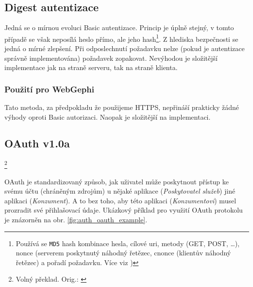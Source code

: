 \documentclass[thesis=M,czech]{FITthesis}[2014/05/6]
\begin{document}
\subsection{Digest autentizace\cite{wiki:digest}}
Jedná se o mírnou evoluci Basic autentizace. Princip je úplně stejný, v tomto případě se však neposílá heslo přímo, ale jeho hash\footnote{Používá se \texttt{MD5} hash kombinace hesla, cílové uri, metody (GET, POST, \ldots), nonce (serverem 
poskytnutý náhodný řetězec, cnonce (klientův náhodný řetězec) a pořadí požadavku. Více viz \cite{wiki:digest})}.
Z hlediska bezpečnosti se jedná o mírné zlepšení. Při odposlechnutí požadavku nelze (pokud je autentizace správně implementována) požadavek zopakovat.
Nevýhodou je složitější implementace jak na straně serveru, tak na straně klienta.

\subsubsection{Použití pro WebGephi}
Tato metoda, za předpokladu že použijeme HTTPS, nepřináší prakticky žádné výhody oproti Basic autorizaci. Naopak je složitější na implementaci.

\subsection{OAuth v1.0a}
\textit{}
\footnote{Volný překlad. Orig.: \textit{}\cite{oauth:v1}}
 
 OAuth je standardizovaný způsob, jak uživatel může poskytnout přístup ke svému účtu (chráněným zdrojům) u nějaké aplikace (\textit{Poskytovatel služeb}) jiné aplikaci (\textit{Konzument}). A
 to bez toho, aby této aplikaci (\textit{Konzumentovi}) musel prozradit své přihlašovací údaje. Ukázkový příklad pro využití OAuth protokolu je znázorněn na obr. \ref{fig:auth_oauth_example}.
\end{document}
